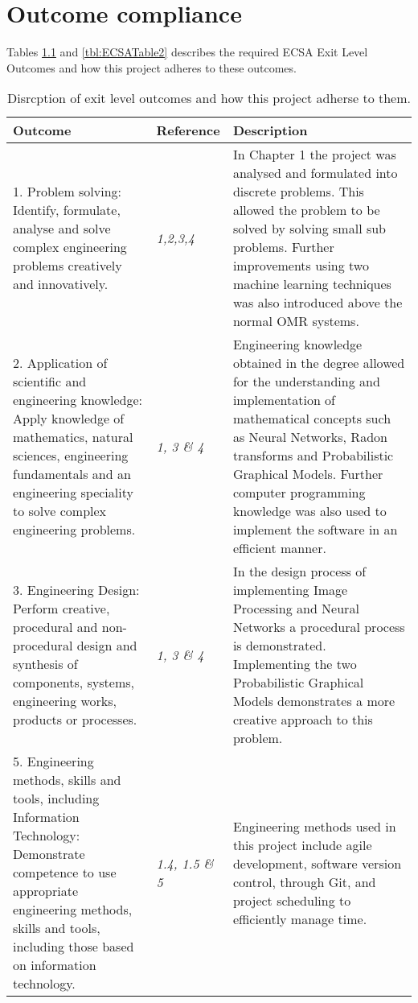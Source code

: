 \chapter{Outcome compliance}
\label{ap:outCompliance}
\graphicspath{{Appendix2/Appendix2figures/}}
Tables \ref{tbl:ECSATable1} and \ref{tbl:ECSATable2} describes the required ECSA Exit Level Outcomes and how this project adheres to these outcomes.
\begin{table}
\caption{Disrcption of exit level outcomes and how this project adherse to them.} \label{tbl:ECSATable1}
\begin{tabular}{|p{6cm}|p{3cm}|p{6cm}|}
\hline
\textbf{Outcome}&\textbf{Reference}&\textbf{Description}\\
\hline
1. Problem solving: Identify, formulate, analyse and solve complex engineering problems creatively and innovatively. & \textit{1,2,3,4} &In Chapter 1 the project was analysed and formulated into discrete problems. This allowed the problem to be solved by solving small sub problems. Further improvements using two machine learning techniques was also introduced above the normal OMR systems.\\
\hline
2. Application of scientific and engineering knowledge: Apply knowledge of mathematics, natural sciences,
engineering fundamentals and an engineering speciality to solve complex engineering problems. & \textit{1, 3 \& 4} & Engineering knowledge obtained in the degree allowed for the understanding and implementation of mathematical concepts such as Neural Networks, Radon transforms and Probabilistic Graphical Models. Further computer programming knowledge was also used to implement the software in an efficient manner.\\
\hline
3. Engineering Design: Perform creative, procedural and non-procedural design and synthesis of components, systems,
engineering works, products or processes. & \textit{1, 3 \& 4} & In the design process of implementing Image Processing and Neural Networks a procedural process is demonstrated. Implementing the two Probabilistic Graphical Models demonstrates a more creative approach to this problem.\\
\hline
5. Engineering methods, skills and tools, including Information Technology: Demonstrate competence to use
appropriate engineering methods, skills and tools, including those based on information technology. &\textit{1.4, 1.5 \& 5}  & Engineering methods used in this project include agile development, software version control, through Git, and project scheduling to efficiently manage time.\\
\hline
\end{tabular}
\end{table}
